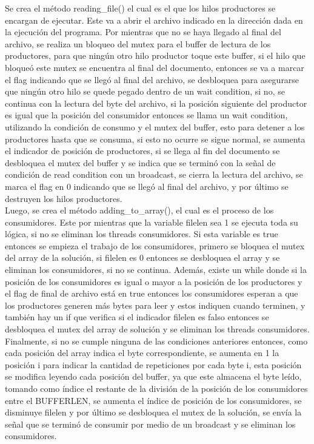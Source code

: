\documentclass[12pt, article, natbib]{IEEEtran}
\begin{document}
Se crea el método reading\_file() el cual es el que los hilos productores se encargan de ejecutar. Este va a abrir el archivo indicado en la dirección dada en la ejecución del programa.\cite{chanilastnam_2015_c} \cite{cppreferencecom_2021_fread} \cite{kerrisk_2010_fseek3} Por mientras que no se haya llegado al final del archivo, se realiza un bloqueo del mutex para el buffer de lectura de los productores, para que ningún otro hilo productor toque este buffer, si el hilo que bloqueó este mutex se encuentra al final del documento, entonces se va a marcar el flag indicando que se llegó al final del archivo, se desbloquea para asegurarse que ningún otro hilo se quede pegado dentro de un wait condition, si no, se continua con la lectura del byte del archivo, si la posición siguiente del productor es igual que la posición del consumidor entonces se llama un wait condition, utilizando la condición de consumo y el mutex del buffer, esto para detener a los productores hasta que se consuma, si esto no ocurre se sigue normal, se aumenta el indicador de posición de productores, si se llega al fin del documento se desbloquea el mutex del buffer y se indica que se terminó con la señal de condición de read condition con un broadcast, se cierra la lectura del archivo, se marca el flag en 0 indicando que se llegó al final del archivo,  y por último se destruyen los hilos productores.\cite{kerrisk_2010_pthread_exit3} \\

Luego, se crea el método adding\_to\_array(), el cual es el proceso de los consumidores. Este por mientras que la variable filelen sea 1 se ejecuta toda su lógica, si no se eliminan los threads consumidores. Si esta variable es true entonces se empieza el trabajo de los consumidores, primero se bloquea el mutex del array de la solución, si filelen es 0 entonces se desbloquea el array y se eliminan los consumidores, si no se continua. Además, existe un while donde si la posición de los consumidores es igual o mayor a la posición de los productores y el flag de final de archivo está en true entonces los consumidores esperan a que los productores generen más bytes para leer y estos indiquen cuando terminen, y también hay un if que verifica si el indicador filelen es falso entonces se desbloquea el mutex del array de solución y se eliminan los threads consumidores. Finalmente, si no se cumple ninguna de las condiciones anteriores entonces, como cada posición del array indica el byte correspondiente, se aumenta en 1 la posición i para indicar la cantidad de repeticiones por cada byte i, esta posición se modifica leyendo cada posición del buffer, ya que este almacena el byte leído, tomando como índice el restante de la división de la posición de los consumidores entre el BUFFERLEN, se aumenta el índice de posición de los consumidores, se disminuye filelen y por último se desbloquea el mutex de la solución, se envía la señal que se terminó de consumir por medio de un broadcast y se eliminan los consumidores.\\
\end{document}
